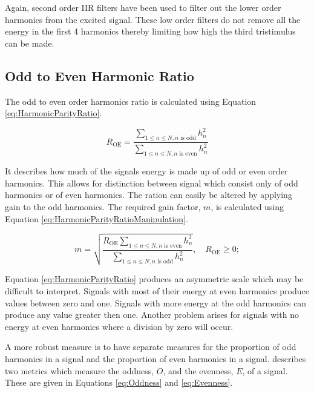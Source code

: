 			Again, second order IIR filters have been used to filter out the lower order harmonics from the
			excited signal.	These low order filters do not remove all the energy in the first 4 harmonics
			thereby limiting how high the third tristimulus can be made.

	\subsection{Odd to Even Harmonic Ratio}
	\label{sec:FeatureControl-Parameterisation-HarmonicParityRatio}
		The odd to even order harmonics ratio is calculated using Equation \ref{eq:HarmonicParityRatio}.
		
		\begin{equation}
			R_{\textrm{OE}} = \frac{\sum_{1 \leq n \leq N, n \textrm{ is odd}} h_{n}^{2}}
			              {\sum_{1 \leq n \leq N, n \textrm{ is even}} h_{n}^{2}}
			\label{eq:HarmonicParityRatio}
		\end{equation}

		It describes how much of the signals energy is made up of odd or even order harmonics. This allows for
		distinction between signal which consist only of odd harmonics or of even harmonics. The ration can easily
		be altered by applying gain to the odd harmonics. The required gain factor, $m$, is calculated using
		Equation \ref{eq:HarmonicParityRatioManipulation}.

		\begin{equation}
			m = \sqrt{\frac{R_{\textrm{OE}}\sum_{1 \leq n \leq N, n \textrm{ is even}} h_{n}^{2}}
			               {\sum_{1 \leq n \leq N, n \textrm{ is odd}} h_{n}^{2}}},
				       \quad R_{\textrm{OE}} \geq 0;
		       \label{eq:HarmonicParityRatioManipulation}
		\end{equation}

		Equation \ref{eq:HarmonicParityRatio} produces an asymmetric scale which may be difficult to interpret.
		Signals with most of their energy at even harmonics produce values between zero and one. Signals with more
		energy at the odd harmonics can produce any value greater then one. Another problem arises for signals with
		no energy at even harmonics where a division by zero will occur.

		A more robust measure is to have separate measures for the proportion of odd harmonics in a signal and the
		proportion of even harmonics in a signal.  \citet{lukasik2005towards} describes two metrics which measure
		the oddness, $O$, and the evenness, $E$, of a signal. These are given in Equations \ref{eq:Oddness} and
		\ref{eq:Evenness}.

